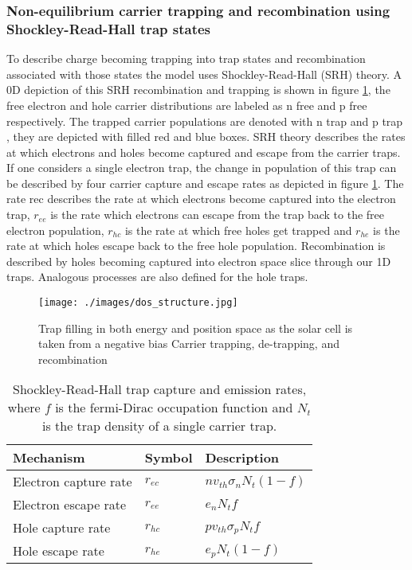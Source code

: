 \subsubsection{Non-equilibrium carrier trapping and recombination using Shockley-Read-Hall trap states} \label{sssec:dynamic}


To describe charge becoming trapping into trap states and recombination associated with those states the model uses Shockley-Read-Hall (SRH) theory. A 0D depiction of this SRH recombination and trapping is shown in figure \ref{fig:dos_structure}, the free electron and hole carrier distributions are labeled as n free and p free respectively. The trapped carrier populations are denoted with n trap and p trap , they are depicted with filled red and blue boxes. SRH theory describes the rates at which electrons and holes become captured and escape from the carrier traps. If one considers a single electron trap, the change in population of this trap can be described by four carrier capture and escape rates as depicted in figure \ref{fig:dos_structure}. The rate rec describes the rate at which electrons become captured into the electron trap, $r_{ee}$ is the rate which electrons can escape from the trap back to the free electron population, $r_{hc}$ is the rate at which free holes get trapped and $r_{he}$ is the rate at which holes escape back to the free hole population. Recombination is described by holes becoming captured into electron space slice through our 1D traps. Analogous processes are also defined for the hole traps.



\begin{figure}
\texttt{[image: ./images/dos\_structure.jpg]}
\caption{Trap filling in both energy and position space as the solar cell is taken from a negative bias
Carrier trapping, de-trapping, and recombination}
\label{fig:dos_structure}
\end{figure}

\begin{table}
\begin{center}
  \begin{tabular}{lll}
  \hline
  Mechanism & Symbol & Description  \\
  \hline
Electron capture rate & $r_{ec}$ & $n v_{th} \sigma_{n} N_{t}(1-f)$ \\
Electron escape rate & $r_{ee}$ & $e_{n} N_{t} f$ \\
Hole capture rate & $r_{hc}$ & $p v_{th} \sigma_{p} N_{t} f$ \\
Hole escape rate & $r_{he}$ & $e_{p} N_{t} (1-f)$\\
  \hline
\end{tabular}
\end{center}
\caption{Shockley-Read-Hall trap capture and emission rates, where $f$ is the fermi-Dirac occupation function and $N_{t}$ is the trap density of a single carrier trap.}
\label{tab:rates}
\end{table}



